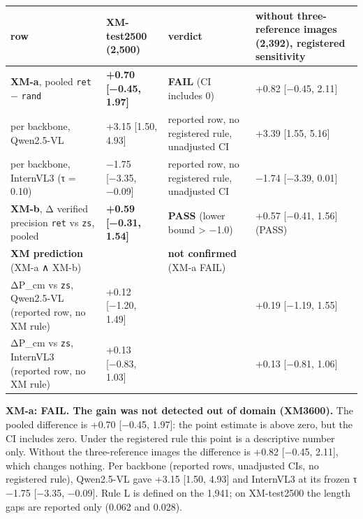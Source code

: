 \begin{longtable}[]{@{}
  >{\raggedright\arraybackslash}p{}
  >{\raggedright\arraybackslash}p{}
  >{\raggedright\arraybackslash}p{}
  >{\raggedright\arraybackslash}p{}@{}}
\toprule\noalign{}
\begin{minipage}[b]{\linewidth}\raggedright
row
\end{minipage} & \begin{minipage}[b]{\linewidth}\raggedright
XM-test2500 (2,500)
\end{minipage} & \begin{minipage}[b]{\linewidth}\raggedright
verdict
\end{minipage} & \begin{minipage}[b]{\linewidth}\raggedright
without three-reference images (2,392), registered sensitivity
\end{minipage} \\
\midrule\noalign{}
\endhead
\bottomrule\noalign{}
\endlastfoot
\textbf{XM-a}, pooled \texttt{ret} − \texttt{rand} & \textbf{+0.70 {[}−0.45, 1.97{]}} &
\textbf{FAIL} (CI includes 0) & +0.82 {[}−0.45, 2.11{]} \\
per backbone, Qwen2.5-VL & +3.15 {[}1.50, 4.93{]} & reported row, no registered rule, unadjusted CI
& +3.39 {[}1.55, 5.16{]} \\
per backbone, InternVL3 (τ = 0.10) & −1.75 {[}−3.35, −0.09{]} & reported row, no registered rule,
unadjusted CI & −1.74 {[}−3.39, 0.01{]} \\
\textbf{XM-b}, Δ verified precision \texttt{ret} vs \texttt{zs}, pooled & \textbf{+0.59 {[}−0.31,
1.54{]}} & \textbf{PASS} (lower bound \textgreater{} −1.0) & +0.57 {[}−0.41, 1.56{]} (PASS) \\
\textbf{XM prediction} (XM-a ∧ XM-b) & & \textbf{not confirmed} (XM-a FAIL) & \\
ΔP\_cm vs \texttt{zs}, Qwen2.5-VL (reported row, no XM rule) & +0.12 {[}−1.20, 1.49{]} & & +0.19
{[}−1.19, 1.55{]} \\
ΔP\_cm vs \texttt{zs}, InternVL3 (reported row, no XM rule) & +0.13 {[}−0.83, 1.03{]} & & +0.13
{[}−0.81, 1.06{]} \\
\end{longtable}

\textbf{XM-a: FAIL. The gain was not detected out of domain (XM3600).} The pooled difference is
+0.70 {[}−0.45, 1.97{]}: the point estimate is above zero, but the CI includes zero. Under the
registered rule this point is a descriptive number only. Without the three-reference images the
difference is +0.82 {[}−0.45, 2.11{]}, which changes nothing. Per backbone (reported rows,
unadjusted CIs, no registered rule), Qwen2.5-VL gave +3.15 {[}1.50, 4.93{]} and InternVL3 at its
frozen τ −1.75 {[}−3.35, −0.09{]}. Rule L is defined on the 1,941; on XM-test2500 the length gaps
are reported only (0.062 and 0.028).

